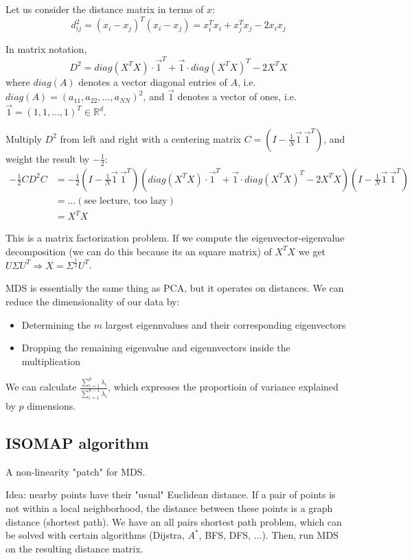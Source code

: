 \documentclass{scrartcl}
\begin{document}
Let us consider the distance matrix in terms of \(x\):
\[d_{ij}^2 = (x_i - x_j)^T(x_i - x_j)=x_i^T x_i + x_j^T x_j - 2 x_i x_j\]

In matrix notation,
\[D^2 = diag(X^T X) \cdot \vec{1}^T + \vec{1} \cdot diag(X^T X)^T - 2X^TX\]
where \(diag(A)\) denotes a vector diagonal entries of \(A\), i.e. \(diag(A) = (a_{11}, a_{22}, \dots, a_{NN})^2\), and \(\vec{1}\) denotes a vector of ones, i.e. \(\vec{1} = (1,1,\dots,1)^T \in \mathbb{R}^d\).

Multiply \(D^2\) from left and right with a centering matrix \(C = (I - \frac{1}{N} \vec{1} \ \vec{1}^T)\), and weight the result by \(-\frac{1}{2}\):
\begin{align*}
    -\frac{1}{2} C D^2 C &= -\frac{1}{2} (I- \frac{1}{N} \vec{1} \ \vec{1}^T) (diag(X^T X) \cdot \vec{1}^T + \vec{1} \cdot diag(X^T X)^T - 2X^TX)(I- \frac{1}{N} \vec{1} \ \vec{1}^T)\\
    &= \dots (\text{see lecture, too lazy}) \\
    &= X^T X
\end{align*}

This is a matrix factorization problem. If we compute the eigenvector-eigenvalue decomposition (we can do this because its an square matrix) of \(X^T X\) we get \(U \Sigma U^T \Rightarrow X = \Sigma^{\frac{1}{2}} U^T\).

MDS is essentially the same thing as PCA, but it operates on distances. We can reduce the dimensionality of our data by:
\begin{itemize}
    \item
        Determining the \(m\) largest eigennvalues and their corresponding eigenvectors
    \item
        Dropping the remaining eigenvalue and eigennvectors inside the multiplication
\end{itemize}

We can calculate \(\frac{\sum_{i=1}^p \lambda_i}{\sum_{i=1}^{n-1} \lambda_i}\), which expresses the proportioin of variance explained by \(p\) dimensions.

\subsection{ISOMAP algorithm}
A non-linearity "patch" for MDS. 

Idea: nearby points have their "usual" Euclidean distance. If a pair of points is not within a local neighborhood, the distance between these points is a graph distance (shortest path). We have an all pairs shortest path problem, which can be solved with certain algorithms (Dijstra, \(A^*\), BFS, DFS, ...). Then, run MDS on the resulting distance matrix. 
\end{document}
